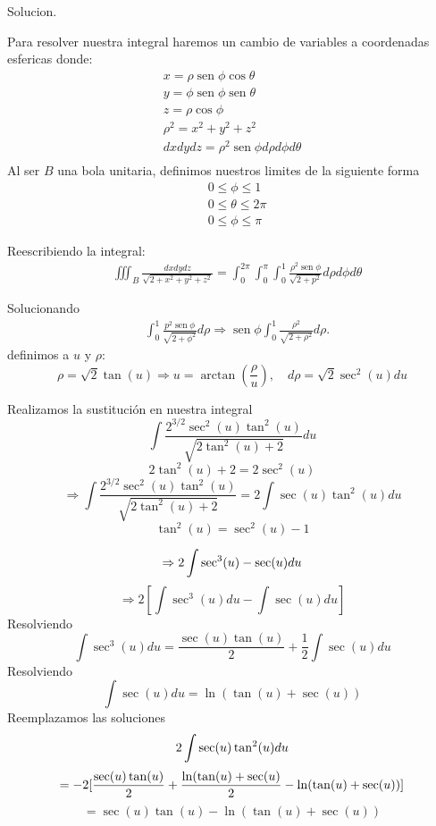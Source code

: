 Solucion.

Para resolver nuestra integral haremos un cambio de variables a coordenadas esfericas donde:
$$
\begin{aligned}
 x=\rho \operatorname{sen} \phi \cos \theta\\
 y=\phi \operatorname{sen} \phi \operatorname{sen} \theta\\ 
 z=\rho \cos \phi \\
 \rho^2=x^2+y^2+z^2 \\
 dxdydz=\rho^2 \operatorname{sen} \phi d \rho d \phi d \theta \\
\end{aligned}
$$
Al ser $B$ una bola unitaria, definimos nuestros limites de la siguiente forma
$$
\begin{aligned}
& 0 \leq \phi \leq 1 \\
& 0 \leq \theta \leq 2 \pi \\
& 0 \leq \phi \leq \pi
\end{aligned}
$$

Reescribiendo la integral:
$$
\begin{aligned}
& \iiint_B \frac{d x d y d z}{\sqrt{2+x^2+y^2+z^2}}=\int_0^{2 \pi} \int_0^\pi \int_0^1 \frac{\rho^2 \operatorname{sen} \phi}{\sqrt{2+p^2}} d \rho d \phi d \theta
\end{aligned}
$$

Solucionando
$$
\begin{aligned}
& \int_0^1 \frac{p^2 \operatorname{sen} \phi}{\sqrt{2+\phi^2}} d \rho \Rightarrow \operatorname{sen} \phi \int_0^1 \frac{\rho^2}{\sqrt{2+\rho^2}} d \rho.
\end{aligned}
$$
definimos a $u$ y $\rho$:
$$
\rho=\sqrt{2} \tan (u) \Rightarrow u=\arctan \left(\frac{\rho}{u}\right), \quad d\rho=\sqrt{2} \sec ^2(u) d u
$$

Realizamos la sustitución en nuestra integral
$$
 \int \frac{2^{3 / 2} \sec ^2(u) \tan ^2(u)}{\sqrt{2 \tan ^2(u)+2}} d u
 $$
 $$
 2\tan^2(u)+2=2\sec^2(u)
 $$
 $$
 \Rightarrow  \int \frac{2^{3 / 2} \sec ^2(u) \tan ^2(u)}{\sqrt{2 \tan ^2(u)+2}}
 =2 \int \sec (u) \tan ^2(u) d u
 $$
 $$
 \tan ^2(u)=\sec ^2(u)-1
 $$
 
 $$
 \Rightarrow 2 \int \sec ^3(u)-\sec (u) d u\\
$$
$$
 \Rightarrow 2\left[\int \sec ^3(u) d u-\int \sec (u) d u\right]
$$
Resolviendo
$$
 \int \sec ^3(u) d u= \frac{\sec (u) \tan (u)}{2}+\frac{1}{2} \int \sec (u) d u
 $$
Resolviendo
$$
 \int \sec (u) d u=\ln (\tan (u)+\sec (u))
 $$
Reemplazamos las soluciones
$$
 2 \int {\sec (u) \tan ^2(u)} d u \\
 $$
 $$
 = -2[\frac{\sec(u)\tan(u)}{2}+\frac{\ln(\tan (u)+\sec(u)}{2}-\ln(\tan (u)+\sec (u))]\\
 $$
 $$
 = \sec (u) \tan (u)-\ln (\tan ( u)+\sec (u))
$$
